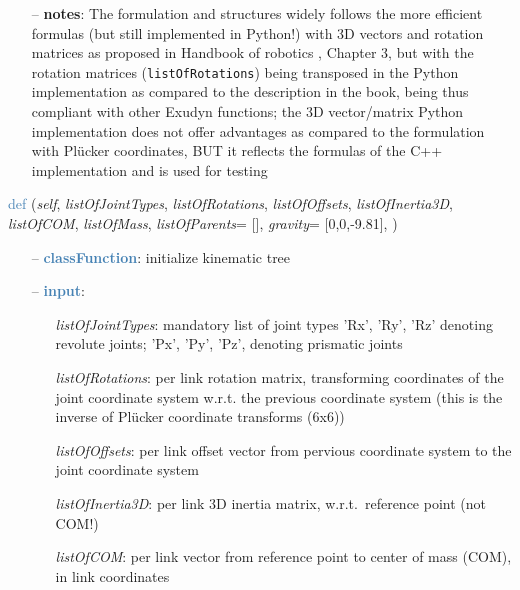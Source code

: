 \begin{itemize}[leftmargin=1.4cm]
\begin{itemize}[leftmargin=1.4cm]
\begin{itemize}[leftmargin=0.5cm]
\begin{itemize}[leftmargin=1.4cm]
\begin{itemize}[leftmargin=1.4cm]
\begin{itemize}[leftmargin=0.5cm]
\begin{itemize}[leftmargin=1.4cm]
\begin{itemize}[leftmargin=0.5cm]
\begin{itemize}[leftmargin=1.4cm]
\begin{itemize}[leftmargin=1.4cm]
\begin{itemize}[leftmargin=1.4cm]
\begin{itemize}[leftmargin=0.7cm]
  \item[--]  {\bf notes}: The formulation and structures widely follows the more efficient formulas (but still implemented in Python!) with 3D vectors and rotation matrices as proposed in Handbook of robotics \cite{Siciliano2016}, Chapter 3, but with the rotation matrices (\texttt{listOfRotations}) being transposed in the Python implementation as compared to the description in the book, being thus compliant with other Exudyn functions; the 3D vector/matrix Python implementation does not offer advantages as compared to the formulation with Pl\"ucker coordinates, BUT it reflects the formulas of the C++ implementation and is used for testing\vspace{24pt}\end{itemize}
%
\begin{flushleft}
\noindent \textcolor{steelblue}{def {\bf {}}}\label{sec:kinematicTree:KinematicTree33:__init__}
({\it self}, {\it listOfJointTypes}, {\it listOfRotations}, {\it listOfOffsets}, {\it listOfInertia3D}, {\it listOfCOM}, {\it listOfMass}, {\it listOfParents}= [], {\it gravity}= [0,0,-9.81], {\it })
\end{flushleft}
\setlength{\itemindent}{0.7cm}
\begin{itemize}[leftmargin=0.7cm]
  \item[--]  \textcolor{steelblue}{\bf classFunction}: initialize kinematic tree  \item[--]  \textcolor{steelblue}{\bf input}: \vspace{-6pt}
  \begin{itemize}[leftmargin=1.2cm]
\setlength{\itemindent}{-0.7cm}
    \item[] {\it listOfJointTypes}: mandatory list of joint types 'Rx', 'Ry', 'Rz' denoting revolute joints; 'Px', 'Py', 'Pz', denoting prismatic joints
    \item[] {\it   listOfRotations}: per link rotation matrix, transforming coordinates of the joint coordinate system w.r.t. the previous coordinate system (this is the inverse of Pl\"ucker coordinate transforms (6x6))
    \item[] {\it   listOfOffsets}: per link offset vector from pervious coordinate system to the joint coordinate system
    \item[] {\it   listOfInertia3D}: per link 3D inertia matrix, w.r.t.\ reference point (not COM!)
    \item[] {\it   listOfCOM}: per link vector from reference point to center of mass (COM), in link coordinates

\end{itemize}
\end{itemize}
\end{itemize}
\end{itemize}
\end{itemize}
\end{itemize}
\end{itemize}
\end{itemize}
\end{itemize}
\end{itemize}
\end{itemize}
\end{itemize}
\end{itemize}
